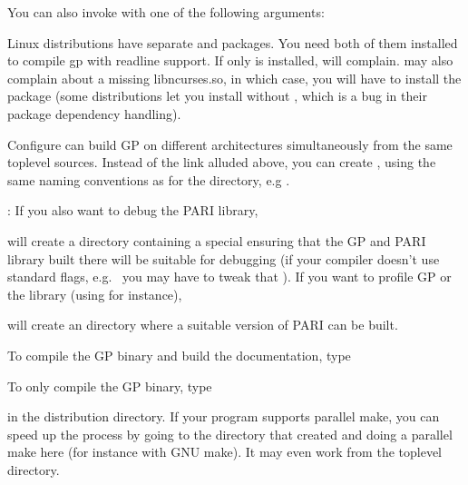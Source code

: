 You can also invoke  with one of the following arguments:




 Linux distributions have separate  and
 packages. You need both of them installed to compile gp
with readline support. If only  is installed, 
will complain.  may also complain about a missing
libncurses.so, in which case, you will have to install the
 package (some distributions let you install
 without , which is a bug in their
package dependency handling).

 Configure can build GP on different architectures
simultaneously from the same toplevel sources. Instead of the 
link alluded above, you can create ,
using the same naming conventions as for the  directory,
e.g .

: If you also want to debug the PARI library,


\noindent will create a directory  containing a special
 ensuring that the GP and PARI library built there will be
suitable for debugging (if your compiler doesn't use standard flags,
e.g.~ you may have to tweak that ). If you want to
profile GP or the library (using  for instance), 


\noindent will create an  directory where a suitable version
of PARI can be built.

 To compile the GP binary and build the
documentation, type


\noindent To only compile the GP binary, type


\noindent in the distribution directory. If your  program supports
parallel make, you can speed up the process by going to the 
directory that  created and doing a parallel make here (for
instance  with GNU make). It may even work from the toplevel
directory.


